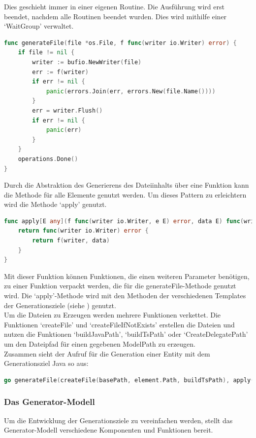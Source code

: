 \documentclass[./einleitung.tex]{subfiles}
\begin{document}
    Dies geschieht immer in einer eigenen Routine.
    Die Ausführung wird erst beendet, nachdem alle Routinen beendet wurden.
    Dies wird mithilfe einer `WaitGroup' verwaltet.
    \begin{lstlisting}[language=Go, caption=Die Methode generateFile, label=lst:generateFile]
func generateFile(file *os.File, f func(writer io.Writer) error) {
	if file != nil {
		writer := bufio.NewWriter(file)
		err := f(writer)
		if err != nil {
			panic(errors.Join(err, errors.New(file.Name())))
		}
		err = writer.Flush()
		if err != nil {
			panic(err)
		}
	}
	operations.Done()
}
    \end{lstlisting}
    Durch die Abstraktion des Generierens des Dateiinhalts über eine Funktion kann die Methode für alle Elemente genutzt werden.
    Um dieses Pattern zu erleichtern wird die Methode `apply' genutzt.
    \begin{lstlisting}[language=Go, caption=Die apply-Methode, label=lst:apply]
func apply[E any](f func(writer io.Writer, e E) error, data E) func(writer io.Writer) error {
	return func(writer io.Writer) error {
		return f(writer, data)
	}
}
    \end{lstlisting}
    Mit dieser Funktion können Funktionen, die einen weiteren Parameter benötigen, zu einer Funktion verpackt werden, die für die generateFile-Methode genutzt wird.
    Die `apply'-Methode wird mit den Methoden der verschiedenen Templates der Generationsziele (siehe ) genutzt.\\

    Um die Dateien zu Erzeugen werden mehrere Funktionen verkettet.
    Die Funktionen `createFile' und `createFileIfNotExists' erstellen die Dateien und nutzen die Funktionen `buildJavaPath', `buildTsPath' oder `CreateDelegatePath' um den Dateipfad für einen gegebenen ModelPath zu erzeugen.\\
    Zusammen sieht der Aufruf für die Generation einer Entity mit dem Generationsziel Java so aus:
    \begin{lstlisting}[language=Go, caption=Generation einer Entity, label=lst:generateEntity]
go generateFile(createFile(basePath, element.Path, buildTsPath), apply(template.GenerateEntity, element))
    \end{lstlisting}

    \subsubsection{Das Generator-Modell}\label{subsubsec:generator-modell}
    Um die Entwicklung der Generationsziele zu vereinfachen werden, stellt das Generator-Modell verschiedene Komponenten und Funktionen bereit.
\end{document}
